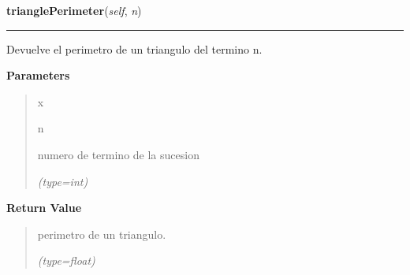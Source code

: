 \hspace{.8\funcindent}\begin{boxedminipage}{\funcwidth}

    \raggedright \textbf{trianglePerimeter}(\textit{self}, \textit{n})

    \vspace{-1.5ex}

    \rule{\textwidth}{0.5\fboxrule}
\setlength{\parskip}{2ex}
    Devuelve el perimetro de un triangulo del termino n.

\setlength{\parskip}{1ex}
      \textbf{Parameters}
      \vspace{-1ex}

      \begin{quote}
        \begin{Ventry}{x}

          \item[n]

          numero de termino de la sucesion

            {\it (type=int)}

        \end{Ventry}

      \end{quote}

      \textbf{Return Value}
    \vspace{-1ex}

      \begin{quote}
      perimetro de un triangulo.

      {\it (type=float)}

      \end{quote}

    \end{boxedminipage}

    \label{FractalZE:sierpinsky:Sierpinsky:totalPerimeter}

    \vspace{0.5ex}

